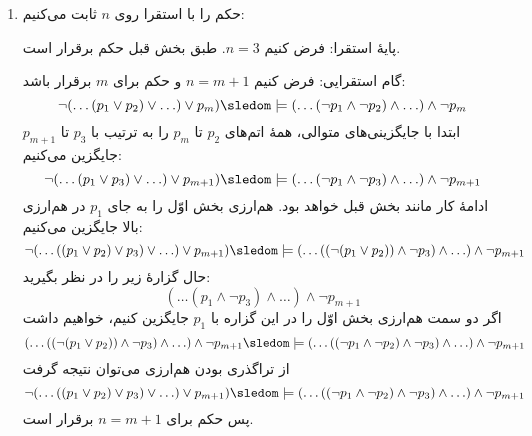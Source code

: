 \begin{ans}
\begin{enumerate}[label=(\alph*)]
      \item
      حکم را با استقرا روی
      $n$
      ثابت می‌کنیم:
  
      پایهٔ استقرا:
      فرض کنیم $n = 3$. طبق بخش قبل حکم برقرار است.
  
      گام استقرایی:
      فرض کنیم $n = m+1$ و حکم برای $m$ برقرار باشد:
      $$\neg(\ldots(p_1\vee p_2)\vee \ldots)\vee p_m)\sledom\models (\ldots(\neg p_1\wedge \neg p_2)\wedge\ldots)\wedge\neg p_m$$
      ابتدا با جایگزینی‌های متوالی، همهٔ اتم‌های $p_2$ تا $p_m$ را به ترتیب با $p_3$ تا $p_{m+1}$ جایگزین می‌کنیم:
      $$\neg(\ldots(p_1\vee p_3)\vee \ldots)\vee p_{m+1})\sledom\models (\ldots(\neg p_1\wedge \neg p_3)\wedge\ldots)\wedge\neg p_{m+1}$$
      ادامهٔ کار مانند بخش قبل خواهد بود. هم‌ارزی بخش اوّل را به جای $p_1$ در هم‌ارزی بالا جایگزین می‌کنیم:
      $$\neg(\ldots((p_1 \vee p_2) \vee p_3)\vee \ldots)\vee p_{m+1})\sledom\models (\ldots((\neg (p_1 \vee p_2))\wedge \neg p_3)\wedge\ldots)\wedge\neg p_{m+1}$$
      حال گزارهٔ زیر را در نظر بگیرید:
      $$(\ldots(p_1\wedge \neg p_3)\wedge\ldots)\wedge\neg p_{m+1}$$
      اگر دو سمت هم‌ارزی بخش اوّل را در این گزاره با $p_1$ جایگزین کنیم، خواهیم داشت
      $$ (\ldots((\neg (p_1 \vee p_2))\wedge \neg p_3)\wedge\ldots)\wedge\neg p_{m+1} \sledom\models (\ldots((\neg p_1 \wedge \neg p_2) \wedge \neg p_3)\wedge\ldots)\wedge\neg p_{m+1}  $$
      از تراگذری بودن هم‌ارزی می‌توان نتیجه گرفت
      $$ \neg(\ldots((p_1 \vee p_2) \vee p_3)\vee \ldots)\vee p_{m+1}) \sledom\models (\ldots((\neg p_1 \wedge \neg p_2) \wedge \neg p_3)\wedge\ldots)\wedge\neg p_{m+1}  $$
      پس حکم برای $n = m+1$ برقرار است.
    \end{enumerate}
  \end{ans}
  
